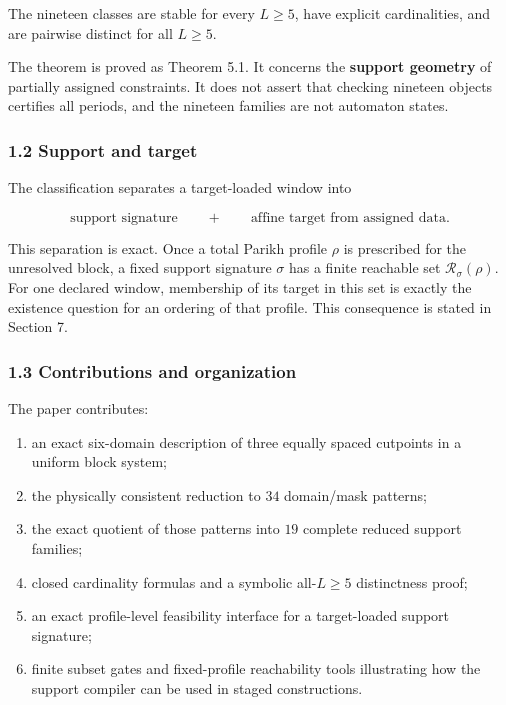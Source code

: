 \documentclass[
  british,
  a4paper,
  11pt]{article}
\providecommand{\tightlist}{%
  \setlength{\itemsep}{0pt}\setlength{\parskip}{0pt}}
\begin{document}
The nineteen classes are stable for every \(L\ge5\), have explicit
cardinalities, and are pairwise distinct for all \(L\ge5\).

The theorem is proved as Theorem 5.1. It concerns the \textbf{support
geometry} of partially assigned constraints. It does not assert that
checking nineteen objects certifies all periods, and the nineteen
families are not automaton states.

\subsubsection{1.2 Support and target}\label{support-and-target}

The classification separates a target-loaded window into

\[
\boxed{\text{support signature}}
\qquad+\qquad
\boxed{\text{affine target from assigned data}}.
\]

This separation is exact. Once a total Parikh profile \(\rho\) is
prescribed for the unresolved block, a fixed support signature
\(\sigma\) has a finite reachable set \(\mathcal R_\sigma(\rho)\). For
one declared window, membership of its target in this set is exactly the
existence question for an ordering of that profile. This consequence is
stated in Section 7.

\subsubsection{1.3 Contributions and
organization}\label{contributions-and-organization}

The paper contributes:

\begin{enumerate}
\def\labelenumi{\arabic{enumi}.}
\tightlist
\item
  an exact six-domain description of three equally spaced cutpoints in a
  uniform block system;
\item
  the physically consistent reduction to \(34\) domain/mask patterns;
\item
  the exact quotient of those patterns into \(19\) complete reduced
  support families;
\item
  closed cardinality formulas and a symbolic all-\(L\ge5\) distinctness
  proof;
\item
  an exact profile-level feasibility interface for a target-loaded
  support signature;
\item
  finite subset gates and fixed-profile reachability tools illustrating
  how the support compiler can be used in staged constructions.
\end{enumerate}
\end{document}
